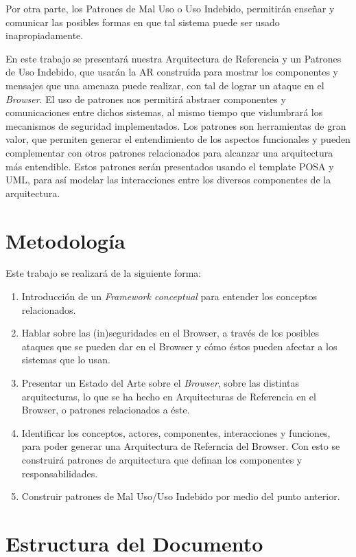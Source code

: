 Por otra parte, los Patrones de Mal Uso o Uso Indebido, permitirán enseñar y comunicar las posibles formas en que tal sistema puede ser usado inapropiadamente.

En este trabajo se presentará nuestra Arquitectura de Referencia y un Patrones de Uso Indebido, que usarán la AR construida para mostrar los componentes y mensajes que una amenaza puede realizar, con tal de lograr un ataque en el \textit{Browser}. El uso de patrones nos permitirá abstraer componentes y comunicaciones entre dichos sistemas, al mismo tiempo que vislumbrará los mecanismos de seguridad implementados. Los patrones son herramientas de gran valor, que permiten generar el entendimiento de los aspectos funcionales y pueden complementar con otros patrones relacionados para alcanzar una arquitectura más entendible. Estos patrones serán presentados usando el template POSA \cite{buschman1996system} y UML, para así modelar las interacciones entre los diversos componentes de la arquitectura.

\section{Metodología}
\label{chap1:Met}
Este trabajo se realizará de la siguiente forma:
\begin{enumerate}
	\item Introducción de un \textit{Framework conceptual} para entender los conceptos relacionados.
	\item Hablar sobre las (in)seguridades en el Browser, a través de los posibles ataques que se pueden dar en el Browser y cómo éstos pueden afectar a los sistemas que lo usan.
	\item Presentar un Estado del Arte sobre el \textit{Browser}, sobre las distintas arquitecturas, lo que se ha hecho en Arquitecturas de Referencia en el Browser, o patrones relacionados a éste.
	\item Identificar los conceptos, actores, componentes, interacciones y funciones, para poder generar una Arquitectura de Referncia del Browser. Con esto se construirá patrones de arquitectura que definan los componentes y responsabilidades.
	\item Construir patrones de Mal Uso/Uso Indebido por medio del punto anterior.
\end{enumerate}

\section{Estructura del Documento}
\label{chap1:estruct}


